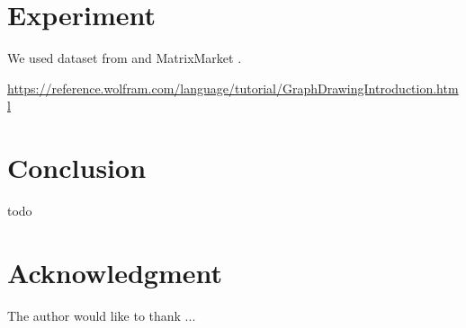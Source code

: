 \documentclass[journal]{IEEEtran}
\begin{document}
\section{Experiment} \label{sec:experiment}

We used dataset from \cite{davis2011university} and MatrixMarket \cite{boisvertMatrixMarketWeb1997}.

\url{https://reference.wolfram.com/language/tutorial/GraphDrawingIntroduction.html}

\section{Conclusion} \label{sec:conclusion}

todo

\section*{Acknowledgment}

The author would like to thank ...

\end{document}
